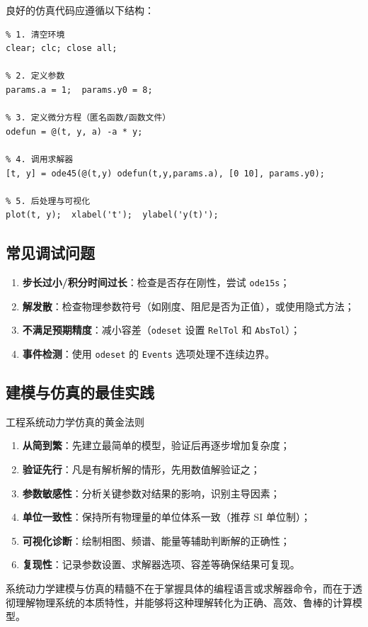 良好的仿真代码应遵循以下结构：
\begin{verbatim}
% 1. 清空环境
clear; clc; close all;

% 2. 定义参数
params.a = 1;  params.y0 = 8;

% 3. 定义微分方程（匿名函数/函数文件）
odefun = @(t, y, a) -a * y;

% 4. 调用求解器
[t, y] = ode45(@(t,y) odefun(t,y,params.a), [0 10], params.y0);

% 5. 后处理与可视化
plot(t, y);  xlabel('t');  ylabel('y(t)');
\end{verbatim}

\subsection{常见调试问题}

\begin{enumerate}
	\item \textbf{步长过小/积分时间过长}：检查是否存在刚性，尝试 \texttt{ode15s}；
	\item \textbf{解发散}：检查物理参数符号（如刚度、阻尼是否为正值），或使用隐式方法；
	\item \textbf{不满足预期精度}：减小容差（\texttt{odeset} 设置 \texttt{RelTol} 和 \texttt{AbsTol}）；
	\item \textbf{事件检测}：使用 \texttt{odeset} 的 \texttt{Events} 选项处理不连续边界。
\end{enumerate}

\subsection{建模与仿真的最佳实践}

\begin{myTheorem}{工程系统动力学仿真的黄金法则}
	\begin{enumerate}
		\item \textbf{从简到繁}：先建立最简单的模型，验证后再逐步增加复杂度；
		\item \textbf{验证先行}：凡是有解析解的情形，先用数值解验证之；
		\item \textbf{参数敏感性}：分析关键参数对结果的影响，识别主导因素；
		\item \textbf{单位一致性}：保持所有物理量的单位体系一致（推荐 SI 单位制）；
		\item \textbf{可视化诊断}：绘制相图、频谱、能量等辅助判断解的正确性；
		\item \textbf{复现性}：记录参数设置、求解器选项、容差等确保结果可复现。
	\end{enumerate}
\end{myTheorem}

\begin{remark}
	系统动力学建模与仿真的精髓不在于掌握具体的编程语言或求解器命令，而在于透彻理解物理系统的本质特性，并能够将这种理解转化为正确、高效、鲁棒的计算模型。
\end{remark}
